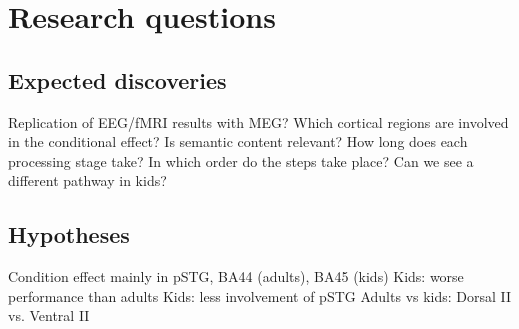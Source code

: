\section{Research questions}

\subsection{Expected discoveries}
Replication of EEG/fMRI results with MEG?
Which cortical regions are involved in the conditional effect?
Is semantic content relevant?
How long does each processing stage take?
In which order do the steps take place?
Can we see a different pathway in kids?

\subsection{Hypotheses}
Condition effect mainly in pSTG, BA44 (adults), BA45 (kids)
Kids: worse performance than adults
Kids: less involvement of pSTG
Adults vs kids: Dorsal II vs. Ventral II